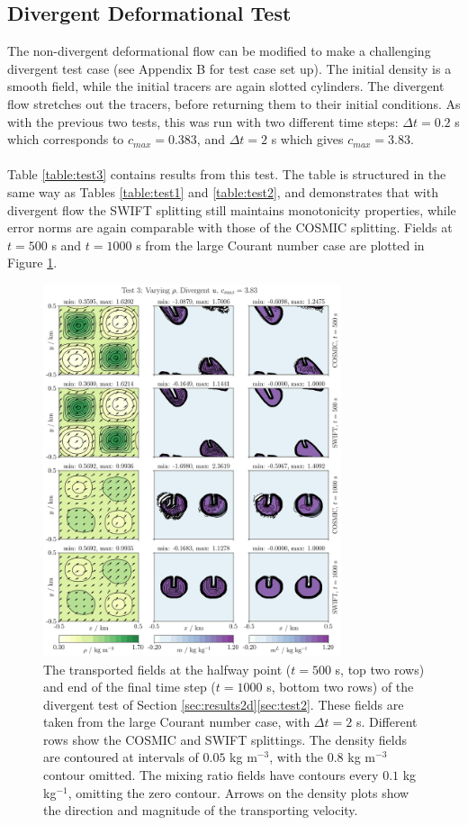 \documentclass{ametsocV6.1}
\begin{document}
\subsection{Divergent Deformational Test} \label{sec:test3}

The non-divergent deformational flow can be modified to make a challenging divergent test case (see Appendix B for test case set up). The initial density is a smooth field, while the initial tracers are again slotted cylinders. The divergent flow stretches out the tracers, before returning them to their initial conditions.
As with the previous two tests, this was run with two different time steps: $\Delta t=0.2$ s which corresponds to $c_{max}=0.383$, and $\Delta t=2$ s which gives $c_{max}=3.83$. \\
\\
Table \ref{table:test3} contains results from this test.
The table is structured in the same way as Tables \ref{table:test1} and \ref{table:test2}, and demonstrates that with divergent flow the SWIFT splitting still maintains monotonicity properties, while error norms are again comparable with those of the COSMIC splitting.
Fields at $t=500$ s and $t=1000$ s from the large Courant number case are plotted in Figure \ref{fig:test3}. \\
\begin{figure}[ht!]
\centering
\includegraphics[width=0.78\textwidth]{fig_5_divergent.jpg}
\caption{The transported fields at the halfway point ($t=500$ s, top two rows) and end of the final time step ($t=1000$ s, bottom two rows) of the divergent test of Section \ref{sec:results2d}\ref{sec:test2}. These fields are taken from the large Courant number case, with $\Delta t=2$ s. Different rows show the COSMIC and SWIFT splittings.
The density fields are contoured at intervals of $0.05$ kg m$^{-3}$, with the $0.8$ kg m$^{-3}$ contour omitted.
The mixing ratio fields have contours every $0.1$ kg kg$^{-1}$, omitting the zero contour.
Arrows on the density plots show the direction and magnitude of the transporting velocity.}\label{fig:test3}
\end{figure} \\
\end{document}
